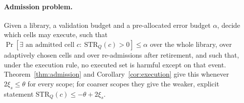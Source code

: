 \paragraph{Admission problem.}
Given a library, a validation budget and a pre-allocated error budget $\alpha$, decide which cells may execute, such that
$\Pr[\exists\text{ an admitted cell }c:\ \mathrm{STR}_{Q}(c)>0]\le\alpha$ over the whole library, over adaptively chosen
cells and over re-admissions after retirement, and such that, under the execution rule, no executed set is harmful except on
that event.  Theorem~\ref{thm:admission} and Corollary~\ref{cor:execution} give this whenever $2\xi_s\le\theta$ for every
scope; for coarser scopes they give the weaker, explicit statement $\mathrm{STR}_{Q}(c)\le-\theta+2\xi_s$.
